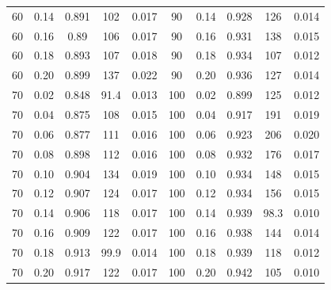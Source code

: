 \documentclass[12pt]{article}
\begin{document}
\begin{spacing}{2.0}
\begin{table}[h!]
\begin{tabular}{c c | c | c c ||c c | c | c c |}
				60	&	0.14	&	0.891	&	102	&	0.017	&	90	&	0.14	&	0.928	&	126	&	0.014	\\
				60	&	0.16	&	0.89	&	106	&	0.017	&	90	&	0.16	&	0.931	&	138	&	0.015	\\
				60	&	0.18	&	0.893	&	107	&	0.018	&	90	&	0.18	&	0.934	&	107	&	0.012	\\
				60	&	0.20	&	0.899	&	137	&	0.022	&	90	&	0.20	&	0.936	&	127	&	0.014	\\
				70	&	0.02	&	0.848	&	91.4	&	0.013	&	100	&	0.02	&	0.899	&	125	&	0.012	\\
				70	&	0.04	&	0.875	&	108	&	0.015	&	100	&	0.04	&	0.917	&	191	&	0.019	\\
				70	&	0.06	&	0.877	&	111	&	0.016	&	100	&	0.06	&	0.923	&	206	&	0.020	\\
				70	&	0.08	&	0.898	&	112	&	0.016	&	100	&	0.08	&	0.932	&	176	&	0.017	\\
				70	&	0.10	&	0.904	&	134	&	0.019	&	100	&	0.10	&	0.934	&	148	&	0.015	\\
				70	&	0.12	&	0.907	&	124	&	0.017	&	100	&	0.12	&	0.934	&	156	&	0.015	\\
				70	&	0.14	&	0.906	&	118	&	0.017	&	100	&	0.14	&	0.939	&	98.3	&	0.010	\\
				70	&	0.16	&	0.909	&	122	&	0.017	&	100	&	0.16	&	0.938	&	144	&	0.014	\\
				70	&	0.18	&	0.913	&	99.9	&	0.014	&	100	&	0.18	&	0.939	&	118	&	0.012	\\
				70	&	0.20	&	0.917	&	122	&	0.017	&	100	&	0.20	&	0.942	&	105	&	0.010	\\
				\hline
			\end{tabular}
			\end{table}



\end{spacing}
\end{document}
